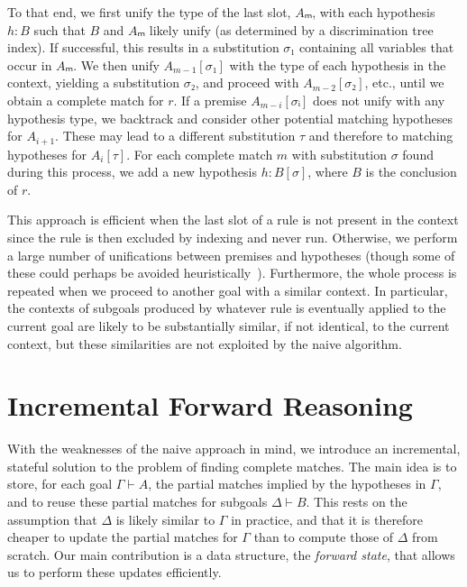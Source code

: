 \documentclass[runningheads,leqno]{llncs}
\begin{document}
To that end, we first unify the type of the last slot, $Aₘ$, with each hypothesis $h : B$ such that $B$ and $Aₘ$ likely unify (as determined by a discrimination tree index).
If successful, this results in a substitution $σ₁$ containing all variables that occur in $Aₘ$.
We then unify $A_{m-1}[σ₁]$ with the type of each hypothesis in the context, yielding a substitution $σ₂$, and proceed with $A_{m-2}[σ₂]$, etc., until we obtain a complete match for $r$.
If a premise $A_{m-i}[σᵢ]$ does not unify with any hypothesis type, we backtrack and consider other potential matching hypotheses for $A_{i+1}$.
These may lead to a different substitution $τ$ and therefore to matching hypotheses for $A_{i}[τ]$.
For each complete match $m$ with substitution $σ$ found during this process, we add a new hypothesis $h : B[σ]$, where $B$ is the conclusion of $r$.

This approach is efficient when the last slot of a rule is not present in the context since the rule is then excluded by indexing and never run.
Otherwise, we perform a large number of unifications between premises and hypotheses (though some of these could perhaps be avoided heuristically~\cite{TammetSubsumption}).
Furthermore, the whole process is repeated when we proceed to another goal with a similar context.
In particular, the contexts of subgoals produced by whatever rule is eventually applied to the current goal are likely to be substantially similar, if not identical, to the current context, but these similarities are not exploited by the naive algorithm.

\section{Incremental Forward Reasoning}%
\label{sec:incremental}

With the weaknesses of the naive approach in mind, we introduce an incremental, stateful solution to the problem of finding complete matches.
The main idea is to store, for each goal $Γ ⊢ A$, the partial matches implied by the hypotheses in $Γ$, and to reuse these partial matches for subgoals $Δ ⊢ B$.
This rests on the assumption that $Δ$ is likely similar to $Γ$ in practice, and that it is therefore cheaper to update the partial matches for $Γ$ than to compute those of $Δ$ from scratch.
Our main contribution is a data structure, the \emph{forward state}, that allows us to perform these updates efficiently.
\end{document}
